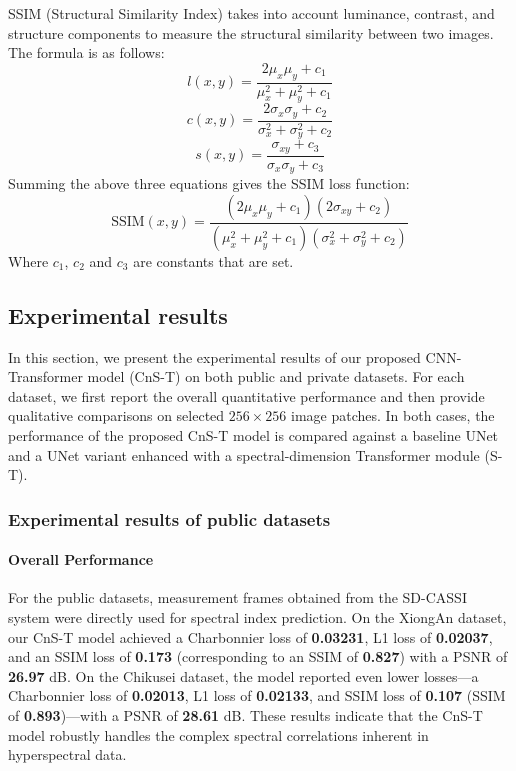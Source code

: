 \documentclass[preprint,review,12pt]{elsarticle}
\begin{document}
SSIM (Structural Similarity Index) takes into account luminance, contrast, and structure components to measure the structural similarity between two images. The formula is as follows:
\begin{equation}
l(x, y) = \frac{2\mu_x\mu_y + c_1}{\mu_x^2 + \mu_y^2 + c_1}
\end{equation}
\begin{equation}
c(x, y) = \frac{2\sigma_x\sigma_y + c_2}{\sigma_x^2 + \sigma_y^2 + c_2}
\end{equation}
\begin{equation}
s(x, y) = \frac{\sigma_{xy} + c_3}{\sigma_x\sigma_y + c_3}
\end{equation}
Summing the above three equations gives the SSIM loss function:
\begin{equation}
\text{SSIM}(x, y) = \frac{(2\mu_x\mu_y + c_1)(2\sigma_{xy} + c_2)}{(\mu_x^2 + \mu_y^2 + c_1)(\sigma_x^2 + \sigma_y^2 + c_2)}
\end{equation}
Where $c_1$, $c_2$ and $c_3$ are constants that are set.

\subsection{Experimental results}

In this section, we present the experimental results of our proposed CNN-Transformer model (CnS-T) on both public and private datasets. For each dataset, we first report the overall quantitative performance and then provide qualitative comparisons on selected $256 \times 256$ image patches. In both cases, the performance of the proposed CnS-T model is compared against a baseline UNet and a UNet variant enhanced with a spectral-dimension Transformer module (S-T).

\subsubsection{Experimental results of public datasets}

\paragraph{Overall Performance}

For the public datasets, measurement frames obtained from the SD-CASSI system were directly used for spectral index prediction. On the XiongAn dataset, our CnS-T model achieved a Charbonnier loss of \textbf{0.03231}, L1 loss of \textbf{0.02037}, and an SSIM loss of \textbf{0.173} (corresponding to an SSIM of \textbf{0.827}) with a PSNR of \textbf{26.97} dB. On the Chikusei dataset, the model reported even lower losses---a Charbonnier loss of \textbf{0.02013}, L1 loss of \textbf{0.02133}, and SSIM loss of \textbf{0.107} (SSIM of \textbf{0.893})---with a PSNR of \textbf{28.61} dB. These results indicate that the CnS-T model robustly handles the complex spectral correlations inherent in hyperspectral data.
\end{document}

